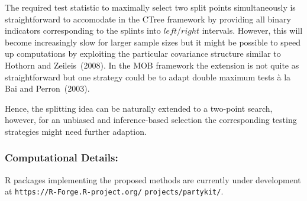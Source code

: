 \documentclass[twoside]{report}
\begin{document}
The required test statistic to maximally select two split points simultaneously is straightforward
to accomodate in the CTree framework by providing all binary indicators corresponding
to the splints into $\mathit{left}$/$\mathit{right}$ intervals. However, this will become
increasingly slow for larger sample sizes but it might be possible to speed up computations by
exploiting the particular covariance structure similar to Hothorn and Zeileis~(2008). In the
MOB framework the extension is not quite as straightforward but one strategy could be to
adapt double maximum tests \`a la Bai and Perron~(2003).

Hence, the splitting idea can be naturally extended to a two-point search, however, for 
an unbiased and inference-based selection the corresponding testing strategies might need
further adaption.

\bigskip

\subsubsection*{Computational Details:}
\textsf{R} packages implementing the proposed methods are currently under development at
\texttt{https://R-Forge.R-project.org/} \texttt{projects/partykit/}.



\bigskip
\end{document}
